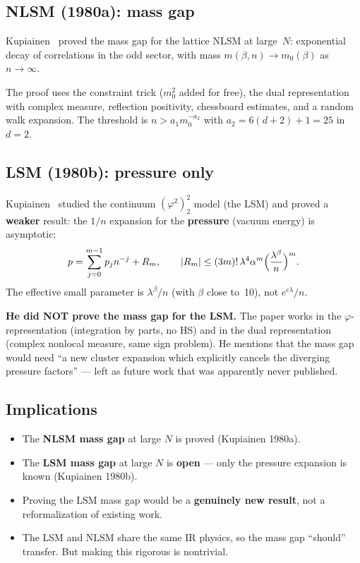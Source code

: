 \documentclass[12pt]{article}
\theoremstyle{definition}
\theoremstyle{remark}
\newcommand{\ph}{\varphi}
\begin{document}
\subsection{NLSM (1980a): mass gap}

Kupiainen~\cite{Kupiainen80} proved the mass gap for the lattice
NLSM at large~$N$: exponential decay of correlations in the odd
sector, with mass $m(\beta,n) \to m_0(\beta)$ as $n \to \infty$.

The proof uses the constraint trick ($m_0^2$ added for free), the
dual representation with complex measure, reflection positivity,
chessboard estimates, and a random walk expansion. The threshold
is $n > a_1 m_0^{-a_2}$ with $a_2 = 6(d+2)+1 = 25$ in $d = 2$.

\subsection{LSM (1980b): pressure only}

Kupiainen~\cite{Kupiainen80b} studied the continuum $(\ph^2)_2^2$
model (the LSM) and proved a \textbf{weaker} result: the $1/n$
expansion for the \textbf{pressure} (vacuum energy) is asymptotic:
\begin{equation}
  p = \sum_{j=0}^{m-1} p_j n^{-j} + R_m,
  \qquad |R_m| \le (3m)!\,\lambda^4\alpha^m
    \Bigl(\frac{\lambda^\beta}{n}\Bigr)^m.
\end{equation}
The effective small parameter is $\lambda^\beta/n$ (with $\beta$
close to~10), not $e^{c\lambda}/n$.

\textbf{He did NOT prove the mass gap for the LSM.} The paper
works in the $\ph$-representation (integration by parts, no HS)
and in the dual representation (complex nonlocal measure, same
sign problem). He mentions that the mass gap would need ``a new
cluster expansion which explicitly cancels the diverging pressure
factors'' --- left as future work that was apparently never published.

\subsection{Implications}

\begin{itemize}
\item The \textbf{NLSM mass gap} at large $N$ is proved (Kupiainen 1980a).
\item The \textbf{LSM mass gap} at large $N$ is \textbf{open} ---
  only the pressure expansion is known (Kupiainen 1980b).
\item Proving the LSM mass gap would be a \textbf{genuinely new result},
  not a reformalization of existing work.
\item The LSM and NLSM share the same IR physics, so the mass gap
  ``should'' transfer. But making this rigorous is nontrivial.
\end{itemize}
\end{document}
